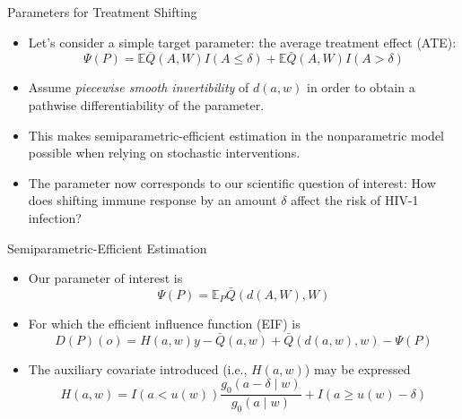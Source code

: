 \documentclass[12pt,t,handout]{beamer}
\newcommand{\E}{\mathbb{E}}
\begin{document}
\begin{frame}[c]{Parameters for Treatment Shifting}

\begin{center}
\begin{itemize}
  \itemsep10pt
  \item Let's consider a simple target parameter: the average treatment effect
    (ATE):
    \[
      \Psi(P) = \E{\bar{Q}(A,W) I(A \leq \delta)} + \E{\bar{Q}(A,W)
        I(A > \delta)}
    \]
  \item Assume \textit{piecewise smooth invertibility} of $d(a,w)$ in order to
    obtain a pathwise differentiability of the parameter.
  \item This makes semiparametric-efficient estimation in the nonparametric
    model possible when relying on stochastic interventions.
  \item The parameter now corresponds to our scientific question of interest:
    How does shifting immune response by an amount $\delta$ affect the risk of
    HIV-1 infection?
\end{itemize}
\end{center}


\end{frame}


\begin{frame}[c]{Semiparametric-Efficient Estimation}

\begin{center}
\begin{itemize}
  \itemsep10pt
  \item Our parameter of interest is
    \[
      \Psi(P) = \E_P{\bar{Q}(d(A, W), W)}
    \]
  \item For which the efficient influence function (EIF) is
    \[
      D(P)(o) = H(a, w){y - \bar{Q}(a, w)} + \bar{Q}(d(a, w), w) - \Psi(P)
    \]
  \item The auxiliary covariate introduced (i.e., $H(a,w)$) may be expressed
    \[
      H(a,w) = I(a < u(w)) \frac{g_0(a - \delta \mid w)}{g_0(a \mid w)} + I(a
      \geq u(w) - \delta)
    \]
\end{itemize}
\end{center}


\end{frame}
\end{document}
